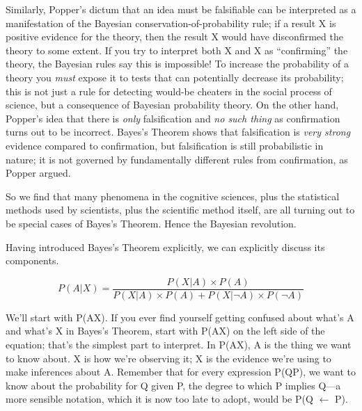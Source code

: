 {
 Similarly, Popper's dictum that an idea must be
falsifiable can be interpreted as a manifestation of the Bayesian
conservation-of-probability rule; if a result X is positive evidence
for the theory, then the result {\textlnot}X would have disconfirmed
the theory to some extent. If you try to interpret both X and
{\textlnot}X as ``confirming'' the
theory, the Bayesian rules say this is impossible! To increase the
probability of a theory you \textit{must} expose it to tests that can
potentially decrease its probability; this is not just a rule for
detecting would-be cheaters in the social process of science, but a
consequence of Bayesian probability theory. On the other hand,
Popper's idea that there is \textit{only} falsification
and \textit{no such thing} as confirmation turns out to be incorrect.
Bayes's Theorem shows that falsification is
\textit{very strong} evidence compared to confirmation, but
falsification is still probabilistic in nature; it is not governed by
fundamentally different rules from confirmation, as Popper argued.}

{
 So we find that many phenomena in the cognitive sciences, plus the
statistical methods used by scientists, plus the scientific method
itself, are all turning out to be special cases of
Bayes's Theorem. Hence the Bayesian revolution.}

{
 Having introduced Bayes's Theorem explicitly, we
can explicitly discuss its components.}

\begin{equation*}
  P(A|X) = \frac{P(X|A) \times P(A)}
  {P(X|A) \times P(A) + P(X|\lnot A)\times P(\lnot A)}
\end{equation*}



\bigskip

{
 We'll start with P(A{\textbar}X). If you ever find
yourself getting confused about what's A and
what's X in Bayes's Theorem, start with
P(A{\textbar}X) on the left side of the equation;
that's the simplest part to interpret. In
P(A{\textbar}X), A is the thing we want to know about. X is how
we're observing it; X is the evidence
we're using to make inferences about A. Remember that
for every expression P(Q{\textbar}P), we want to know about the
probability for Q given P, the degree to which P implies Q---a more
sensible notation, which it is now too late to adopt, would be P(Q
$\leftarrow $ P).}

